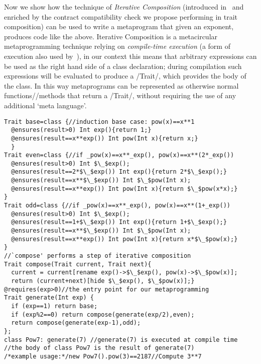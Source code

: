 Now we show how the technique of \emph{Iterative Composition} (introduced in~\cite{servetto2014meta} and
enriched by the contract compatibility check we propose performing in trait composition) 
can be used to write a metaprogram that given an exponent, produces code like the above.
Iterative Composition is a metacircular metaprogramming technique relying on \emph{compile-time execution} (a form of execution also used by~\cite{sheard2002template}),
in our context this means that arbitrary expressions can be used as the right hand side of a class declaration; during compilation such expressions will be evaluated to produce a /Trait/, which provides the body of the class. In this way metaprograms can be represented as otherwise normal functions//methods that return a /Trait/, without requiring the use of any additional `meta language'.
 

\vspace{-1ex}
\begin{lstlisting}
Trait base=class {//induction base case: pow(x)==x**1
  @ensures(result>0) Int exp(){return 1;}  
  @ensures(result==x**exp()) Int pow(Int x){return x;}
  }
Trait even=class {//if _pow(x)==x**_exp(), pow(x)==x**(2*_exp())
  @ensures(result>0) Int $\_$exp();
  @ensures(result==2*$\_$exp()) Int exp(){return 2*$\_$exp();}
  @ensures(result==x**$\_$exp()) Int $\_$pow(Int x);
  @ensures(result==x**exp()) Int pow(Int x){return $\_$pow(x*x);}
}
Trait odd=class {//if _pow(x)==x**_exp(), pow(x)==x**(1+_exp())
  @ensures(result>0) Int $\_$exp();
  @ensures(result==1+$\_$exp()) Int exp(){return 1+$\_$exp();}
  @ensures(result==x**$\_$exp()) Int $\_$pow(Int x);
  @ensures(result==x**exp()) Int pow(Int x){return x*$\_$pow(x);}
}
//`compose' performs a step of iterative composition
Trait compose(Trait current, Trait next){
  current = current[rename exp()->$\_$exp(), pow(x)->$\_$pow(x)];
  return (current+next)[hide $\_$exp(), $\_$pow(x)];}
@requires(exp>0)//the entry point for our metaprogramming
Trait generate(Int exp) {
  if (exp==1) return base;
  if (exp%2==0) return compose(generate(exp/2),even);
  return compose(generate(exp-1),odd);
};
class Pow7: generate(7) //generate(7) is executed at compile time
//the body of class Pow7 is the result of generate(7)
/*example usage:*/new Pow7().pow(3)==2187//Compute 3**7
\end{lstlisting}
\vspace{-1ex}